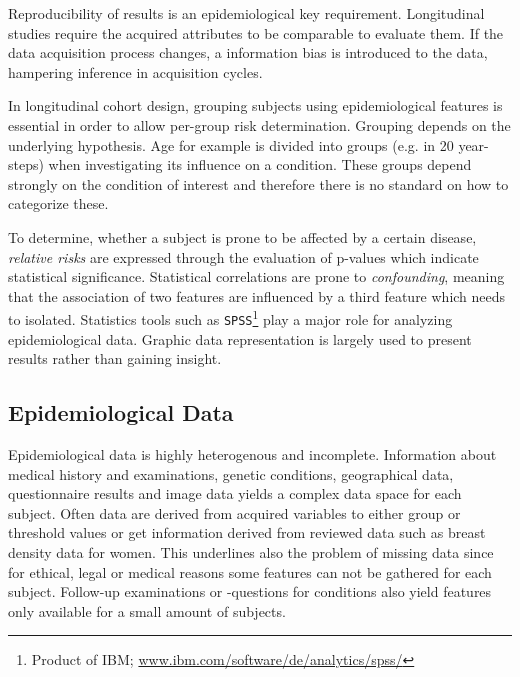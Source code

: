 \documentclass[journal]{style/vgtc} 			          %
\begin{document}
Reproducibility of results is an epidemiological key requirement.
%
Longitudinal studies require the acquired attributes to be comparable to evaluate them.
%
If the data acquisition process changes, a information bias is introduced to the data, hampering inference in acquisition cycles.
%

In longitudinal cohort design, grouping subjects using epidemiological features is essential in order to allow per-group risk determination.
%
Grouping depends on the underlying hypothesis.
%
Age for example is divided into groups (e.g. in 20 year-steps) when investigating its influence on a condition.
%
These groups depend strongly on the condition of interest and therefore there is no standard on how to categorize these.

To determine, whether a subject is prone to be affected by a certain disease, \emph{relative risks} are expressed through the evaluation of p-values which indicate statistical significance.
%
Statistical correlations are prone to \emph{confounding}, meaning that the association of two features are influenced by a third feature which needs to isolated.
%
Statistics tools such as \texttt{SPSS}\footnote{Product of IBM; \url{www.ibm.com/software/de/analytics/spss/}} play a major role for analyzing epidemiological data.
%
Graphic data representation is largely used to present results rather than gaining insight.
	
\subsection{Epidemiological Data} \label{EpidemiologicalData}
Epidemiological data is highly heterogenous and incomplete.
%
Information about medical history and examinations, genetic conditions, geographical data, questionnaire results and image data yields a complex data space for each subject.
%
Often data are derived from acquired variables to either group or threshold values or get information derived from reviewed data such as breast density data for women.
%
This underlines also the problem of missing data since for ethical, legal or medical reasons some features can not be gathered for each subject.
%
Follow-up examinations or -questions for conditions also yield features only available for a small amount of subjects.
%
\end{document}
